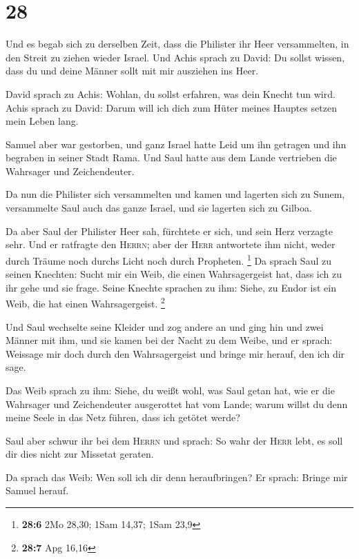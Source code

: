 \hypertarget{section-4}{%
\section{28}\label{section-4}}

 Und es begab sich zu derselben Zeit, dass die Philister
ihr Heer versammelten, in den Streit zu ziehen wieder Israel. Und Achis
sprach zu David: Du sollst wissen, dass du und deine Männer sollt mit
mir ausziehen ins Heer.

 David sprach zu Achis: Wohlan, du sollst erfahren, was
dein Knecht tun wird. Achis sprach zu David: Darum will ich dich zum
Hüter meines Hauptes setzen mein Leben lang.

 Samuel aber war gestorben, und ganz Israel hatte Leid um
ihn getragen und ihn begraben in seiner Stadt Rama. Und Saul hatte aus
dem Lande vertrieben die Wahrsager und Zeichendeuter.

 Da nun die Philister sich versammelten und kamen und
lagerten sich zu Sunem, versammelte Saul auch das ganze Israel, und sie
lagerten sich zu Gilboa.

 Da aber Saul der Philister Heer sah, fürchtete er sich,
und sein Herz verzagte sehr.  Und er ratfragte den
\textsc{Herrn}; aber der \textsc{Herr} antwortete ihm nicht, weder durch
Träume noch durchs Licht noch durch Propheten. \footnote{\textbf{28:6}
  2Mo 28,30; 1Sam 14,37; 1Sam 23,9}  Da sprach Saul zu
seinen Knechten: Sucht mir ein Weib, die einen Wahrsagergeist hat, dass
ich zu ihr gehe und sie frage. Seine Knechte sprachen zu ihm: Siehe, zu
Endor ist ein Weib, die hat einen Wahrsagergeist. \footnote{\textbf{28:7}
  Apg 16,16}

 Und Saul wechselte seine Kleider und zog andere an und
ging hin und zwei Männer mit ihm, und sie kamen bei der Nacht zu dem
Weibe, und er sprach: Weissage mir doch durch den Wahrsagergeist und
bringe mir herauf, den ich dir sage.

 Das Weib sprach zu ihm: Siehe, du weißt wohl, was Saul
getan hat, wie er die Wahrsager und Zeichendeuter ausgerottet hat vom
Lande; warum willst du denn meine Seele in das Netz führen, dass ich
getötet werde?

 Saul aber schwur ihr bei dem \textsc{Herrn} und sprach:
So wahr der \textsc{Herr} lebt, es soll dir dies nicht zur Missetat
geraten.

 Da sprach das Weib: Wen soll ich dir denn heraufbringen?
Er sprach: Bringe mir Samuel herauf.

